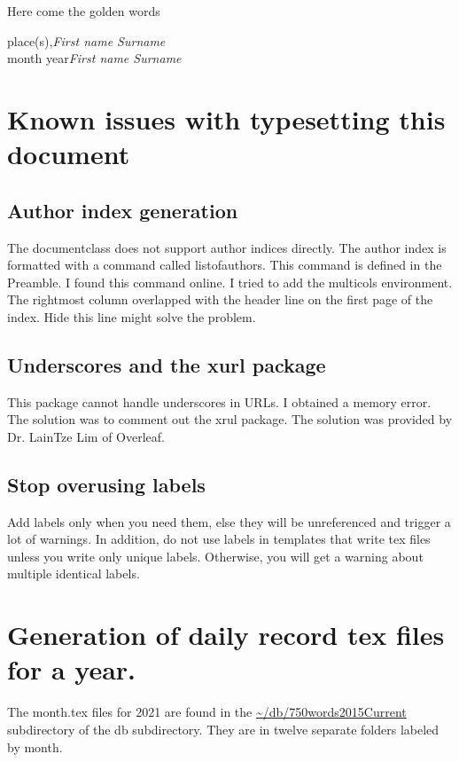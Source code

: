 \preface
{}
Here come the golden words


\vspace{1cm}
\begin{flushright}\noindent
place(s),\hfill {\it First name  Surname}\\
month year\hfill {\it First name  Surname}\\
\end{flushright}


\section*{Known issues with typesetting this document}

\subsection{Author index generation}
The documentclass does not support author indices directly.
The author index is formatted with a command called listofauthors.
This command is defined in the Preamble. 
I found this command online.
I tried to add the multicols environment.
The rightmost column overlapped with the header line on the first page of the index.
Hide this line might solve the problem.

\subsection{Underscores and the xurl package}
This package cannot handle underscores in URLs.
I obtained a memory error.
The solution was to comment out the xrul package.
The solution was provided by Dr. LainTze Lim of Overleaf.

\subsection{Stop overusing labels}
Add labels only when you need them, else they will be unreferenced and trigger a lot of warnings.
In addition, do not use labels in templates that write tex files unless you write only unique labels.
Otherwise, you will get a warning about multiple identical labels.

\section*{Generation of daily record tex files for a year.}
The month.tex files for 2021 are found in the \url{~/db/750words2015Current} subdirectory of the db subdirectory.
They are in twelve separate folders labeled by month.

